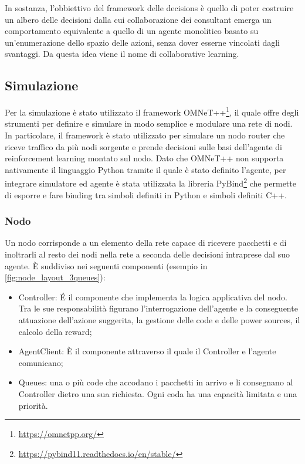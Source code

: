 \documentclass[conference]{IEEEtran}
\begin{document}
In sostanza, l'obbiettivo del framework delle decisions è quello di poter costruire un albero
delle decisioni dalla cui collaborazione dei consultant emerga un comportamento
equivalente a quello di un agente monolitico basato su un'enumerazione dello spazio
delle azioni, senza dover esserne vincolati dagli svantaggi. Da questa idea
viene il nome di collaborative learning.

\subsection{Simulazione}
Per la simulazione è stato utilizzato il framework OMNeT++\footnote{\href{https://omnetpp.org/}{https://omnetpp.org/}}, il quale offre degli strumenti per definire e simulare in modo semplice e modulare una rete di nodi. In particolare, il framework è stato utilizzato per simulare un nodo router che riceve traffico da più nodi sorgente e prende decisioni sulle basi dell'agente di reinforcement learning montato sul nodo. Dato che OMNeT++ non supporta nativamente il linguaggio Python tramite il quale è stato definito l'agente, per integrare simulatore ed agente è stata utilizzata la libreria PyBind\footnote{\href{https://pybind11.readthedocs.io/en/stable/}{https://pybind11.readthedocs.io/en/stable/}} che permette di esporre e fare binding tra simboli definiti in Python e simboli definiti C++. 

\subsubsection{Nodo}
Un nodo corrisponde a un elemento della rete capace di ricevere pacchetti e di inoltrarli 
al resto dei nodi nella rete a seconda delle decisioni intraprese dal suo agente.
È suddiviso nei seguenti componenti (esempio in \autoref{fig:node_layout_3queues}):
\begin{itemize}
    \item Controller: É il componente che implementa la logica applicativa del nodo.
    Tra le sue responsabilità figurano l'interrogazione dell'agente e la conseguente
    attuazione dell'azione suggerita, la gestione delle code e delle power sources,
    il calcolo della reward;
    \item AgentClient: È il componente attraverso il quale il Controller e l'agente
    comunicano;
    \item Queues: una o più code che accodano i pacchetti in arrivo e li consegnano
     al Controller
    dietro una sua richiesta. Ogni coda ha una capacità limitata e una priorità.
\end{itemize}
\end{document}
